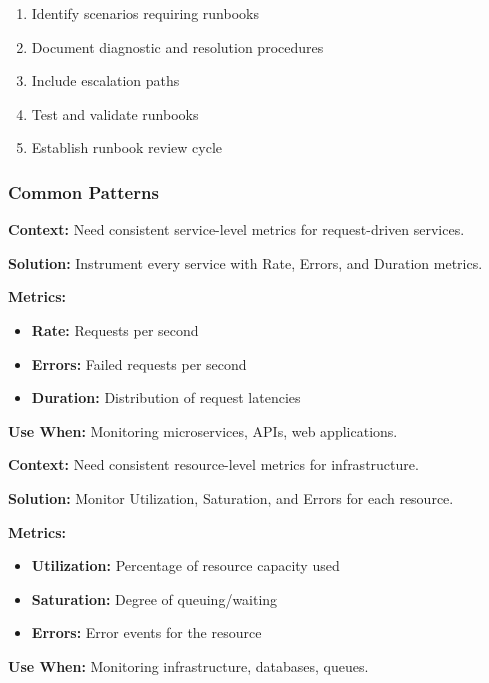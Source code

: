 \documentclass[11pt,letterpaper]{article}
\begin{document}
\begin{guidancebox}
\begin{enumerate}[nosep]
    \item Identify scenarios requiring runbooks
    \item Document diagnostic and resolution procedures
    \item Include escalation paths
    \item Test and validate runbooks
    \item Establish runbook review cycle
\end{enumerate}
\end{guidancebox}

\subsubsection{Common Patterns}

\begin{patternbox}
\textbf{Context:} Need consistent service-level metrics for request-driven services.

\textbf{Solution:} Instrument every service with Rate, Errors, and Duration metrics.

\textbf{Metrics:}
\begin{itemize}[nosep]
    \item \textbf{Rate:} Requests per second
    \item \textbf{Errors:} Failed requests per second
    \item \textbf{Duration:} Distribution of request latencies
\end{itemize}

\textbf{Use When:} Monitoring microservices, APIs, web applications.
\end{patternbox}

\begin{patternbox}
\textbf{Context:} Need consistent resource-level metrics for infrastructure.

\textbf{Solution:} Monitor Utilization, Saturation, and Errors for each resource.

\textbf{Metrics:}
\begin{itemize}[nosep]
    \item \textbf{Utilization:} Percentage of resource capacity used
    \item \textbf{Saturation:} Degree of queuing/waiting
    \item \textbf{Errors:} Error events for the resource
\end{itemize}

\textbf{Use When:} Monitoring infrastructure, databases, queues.
\end{patternbox}
\end{document}
